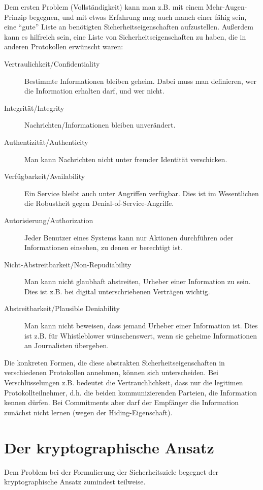 Dem ersten Problem (Vollständigkeit) kann man z.B. mit einem Mehr-Augen-Prinzip begegnen, und mit etwas Erfahrung mag auch manch einer fähig sein, eine "`gute"' Liste an benötigten Sicherheitseigenschaften aufzustellen.
Außerdem kann es hilfreich sein, eine Liste von Sicherheitseigenschaften zu haben, die in anderen Protokollen erwünscht waren:

\begin{description}
	\item[Vertraulichkeit/Confidentiality] Bestimmte Informationen bleiben geheim. Dabei muss man definieren, wer die Information erhalten darf, und wer nicht.
	\item[Integrität/Integrity] Nachrichten/Informationen bleiben unverändert.
	\item[Authentizität/Authenticity] Man kann Nachrichten nicht unter fremder Identität verschicken.
	\item[Verfügbarkeit/Availability] Ein Service bleibt auch unter Angriffen verfügbar. Dies ist im Wesentlichen die Robustheit gegen Denial-of-Service-Angriffe.
	\item[Autorisierung/Authorization] Jeder Benutzer eines Systems kann nur Aktionen durchführen oder Informationen einsehen, zu denen er berechtigt ist.
	\item[Nicht-Abstreitbarkeit/Non-Repudiability] Man kann nicht glaubhaft abstreiten, Urheber einer Information zu sein. Dies ist z.B. bei digital unterschriebenen Verträgen wichtig.
	\item[Abstreitbarkeit/Plausible Deniability] Man kann nicht beweisen, dass jemand Urheber einer Information ist. Dies ist z.B. für Whistleblower wünschenswert, wenn sie geheime Informationen an Journalisten übergeben.
\end{description}

Die konkreten Formen, die diese abstrakten Sicherheitseigenschaften in verschiedenen Protokollen annehmen, können sich unterscheiden.
Bei Verschlüsselungen z.B. bedeutet die Vertrauchlichkeit, dass nur die legitimen Protokollteilnehmer, d.h. die beiden kommunizierenden Parteien, die Information kennen dürfen.
Bei Commitments aber darf der Empfänger die Information zunächst nicht lernen (wegen der Hiding-Eigenschaft).

\section{Der kryptographische Ansatz}

Dem Problem bei der Formulierung der Sicherheitsziele begegnet der kryptographische Ansatz zumindest teilweise.

